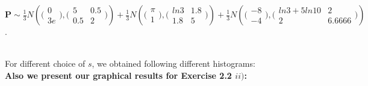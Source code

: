 \documentclass{article}
\begin{document}
\begin{center} \vspace*{-0.8cm}
$\mathbf{P} \sim \frac{1}{3} N ( \bigl(\begin{smallmatrix} 0 \\ 3e \end{smallmatrix}\bigr), \bigl(\begin{smallmatrix} 5 & 0.5\\ 0.5 & 2 \end{smallmatrix}\bigr) ) + \frac{1}{3} N ( \bigl(\begin{smallmatrix} \pi \\ 1 \end{smallmatrix}\bigr), \bigl(\begin{smallmatrix} ln3 & 1.8\\ 1.8 & 5 \end{smallmatrix}\bigr) ) + \frac{1}{3} N ( \bigl(\begin{smallmatrix} -8 \\ -4 \end{smallmatrix}\bigr), \bigl(\begin{smallmatrix} ln3+5ln10 & 2\\ 2 & 6.6666 \end{smallmatrix}\bigr) )$.
\end{center} \ \vspace*{-0.7cm}\\
For different choice of $s$, we obtained following different histograms: \\
\iffalse
\begin{figure}
\centering
\texttt{[image: exp.eps]}
\caption{yes}
\label{1}
\end{figure}
\fi 
\textbf{Also we present our graphical results for Exercise 2.2 $ii)$:} \\
\end{document}
